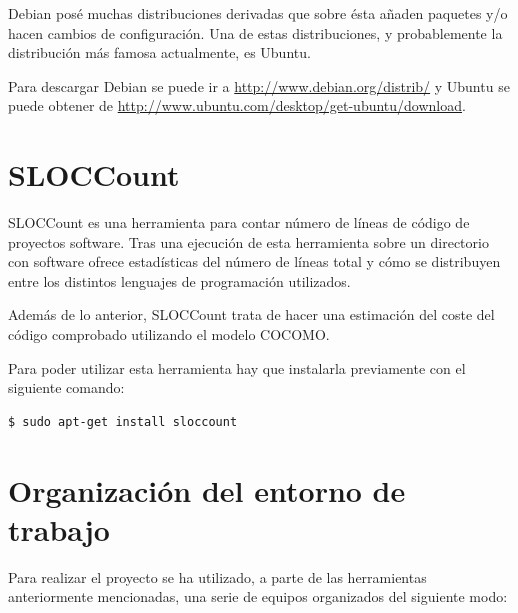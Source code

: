 Debian posé muchas distribuciones derivadas que sobre ésta añaden paquetes y/o hacen cambios de configuración. Una de estas distribuciones, y probablemente la distribución más famosa actualmente, es Ubuntu.

Para descargar Debian se puede ir a \url{http://www.debian.org/distrib/} y Ubuntu se puede obtener de \url{http://www.ubuntu.com/desktop/get-ubuntu/download}.

\section{SLOCCount}

SLOCCount es una herramienta para contar número de líneas de código de proyectos software. Tras una ejecución de esta herramienta sobre un directorio con software ofrece estadísticas del número de líneas total y cómo se distribuyen entre los distintos lenguajes de programación utilizados.

Además de lo anterior, SLOCCount trata de hacer una estimación del coste del código comprobado utilizando el modelo COCOMO.

Para poder utilizar esta herramienta hay que instalarla previamente con el siguiente comando:

\begin{verbatim}
$ sudo apt-get install sloccount
\end{verbatim}

\section{Organización del entorno de trabajo}

Para realizar el proyecto se ha utilizado, a parte de las herramientas anteriormente mencionadas, una serie de equipos organizados del siguiente modo:

